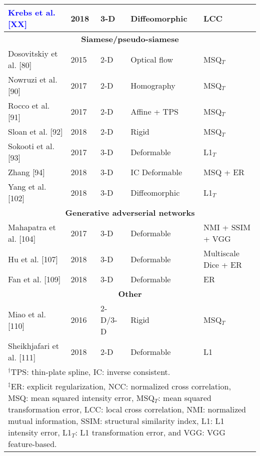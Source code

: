 \begin{table}[!htb]
\begin{tabular*}{\textwidth}{l@{\extracolsep{\fill}}l@{\extracolsep{\fill}}l@{\extracolsep{\fill}}l@{\extracolsep{\fill}}l}
  \textcolor{blue}{Krebs et al. [XX]} & 2018 & 3-D & Diffeomorphic & LCC \\
\midrule
\multicolumn{5}{c}{\textbf{Siamese/pseudo-siamese}}
  \vspace{0.25cm} \\
  Dosovitskiy et al. [80] & 2015 & 2-D & Optical flow & MSQ$_T$ \\ %
  Nowruzi et al. [90] & 2017 & 2-D & Homography & MSQ$_T$ \\
  Rocco et al. [91] & 2017 & 2-D & Affine + TPS & MSQ$_T$ \\
  Sloan et al. [92] & 2018 & 2-D & Rigid & MSQ$_T$ \\  %
  Sokooti et al. [93] & 2017 & 3-D & Deformable & L1$_T$ \\
  Zhang [94] & 2018 & 3-D & IC Deformable & MSQ + ER \\
  Yang et al. [102] & 2018 & 3-D & Diffeomorphic & L1$_T$ \\  %
\midrule
\multicolumn{5}{c}{\textbf{Generative adverserial networks}}
  \vspace{0.25cm} \\
  Mahapatra et al. [104] & 2017 & 3-D & Deformable & NMI + SSIM + VGG \\
  Hu et al. [107] & 2018 & 3-D & Deformable & Multiscale Dice + ER \\
  Fan et al. [109] & 2018 & 3-D & Deformable & ER \\
\midrule
\multicolumn{5}{c}{\textbf{Other}}
  \vspace{0.25cm} \\
  Miao et al. [110] & 2016 & 2-D/3-D & Rigid & MSQ$_T$ \\
  Sheikhjafari et al. [111] & 2018 & 2-D & Deformable & L1 \\
\bottomrule
\multicolumn{5}{l}{
  \begin{minipage}[t]{0.9\columnwidth}%
    \footnotesize{$^\dagger$TPS: thin-plate spline, IC: inverse consistent.}
  \end{minipage}
  } \\
\multicolumn{5}{l}{
  \begin{minipage}[t]{0.9\columnwidth}%
    \footnotesize{$^\ddagger$ER:  explicit regularization,
      NCC: normalized cross correlation,
      MSQ: mean squared intensity error,
      MSQ$_T$: mean squared transformation error,
      LCC:  local cross correlation,
      NMI:  normalized mutual information,
      SSIM:  structural similarity index,
      L1:  L1 intensity error,
      L1$_T$: L1 transformation error, and
      VGG: VGG feature-based.}
  \end{minipage}
  }
\end{tabular*}
\end{table}


